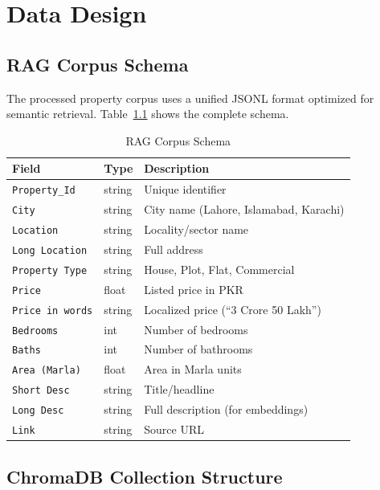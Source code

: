 \chapter{Data Design}
\label{ch:data-design}

\section{RAG Corpus Schema}

The processed property corpus uses a unified JSONL format optimized for semantic retrieval. Table~\ref{tab:corpus-schema} shows the complete schema.

\begin{table}[!htbp]
\centering
\caption{RAG Corpus Schema}
\label{tab:corpus-schema}
\renewcommand{\arraystretch}{1.2}
\begin{tabular}{|l|l|p{6cm}|}
\hline
\textbf{Field} & \textbf{Type} & \textbf{Description} \\ \hline
\texttt{Property\_Id} & string & Unique identifier \\ \hline
\texttt{City} & string & City name (Lahore, Islamabad, Karachi) \\ \hline
\texttt{Location} & string & Locality/sector name \\ \hline
\texttt{Long Location} & string & Full address \\ \hline
\texttt{Property Type} & string & House, Plot, Flat, Commercial \\ \hline
\texttt{Price} & float & Listed price in PKR \\ \hline
\texttt{Price in words} & string & Localized price (``3 Crore 50 Lakh'') \\ \hline
\texttt{Bedrooms} & int & Number of bedrooms \\ \hline
\texttt{Baths} & int & Number of bathrooms \\ \hline
\texttt{Area (Marla)} & float & Area in Marla units \\ \hline
\texttt{Short Desc} & string & Title/headline \\ \hline
\texttt{Long Desc} & string & Full description (for embeddings) \\ \hline
\texttt{Link} & string & Source URL \\ \hline
\end{tabular}
\end{table}

\section{ChromaDB Collection Structure}

